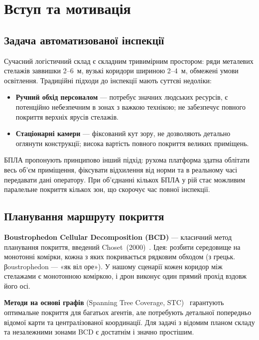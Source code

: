 \section{Вступ та мотивація}

\subsection{Задача автоматизованої інспекції}

Сучасний логістичний склад є складним тривимірним простором: ряди металевих стелажів заввишки 2–6~м, вузькі коридори шириною 2–4~м, обмежені умови освітлення. Традиційні підходи до інспекції мають суттєві недоліки:

\begin{itemize}
  \item \textbf{Ручний обхід персоналом} — потребує значних людських ресурсів, є потенційно небезпечним в зонах з важкою технікою; не забезпечує повного покриття верхніх ярусів стелажів.
  \item \textbf{Стаціонарні камери} — фіксований кут зору, не дозволяють детально оглянути конструкції; висока вартість повного покриття великих приміщень.
\end{itemize}

БПЛА пропонують принципово інший підхід: рухома платформа здатна облітати весь об'єм приміщення, фіксувати відхилення від норми та в реальному часі передавати дані оператору. При об'єднанні кількох БПЛА у рій стає можливим паралельне покриття кількох зон, що скорочує час повної інспекції.

\subsection{Планування маршруту покриття}

\textbf{Boustrophedon Cellular Decomposition (BCD)} — класичний метод планування покриття, введений Choset~(2000)~\cite{Choset2000}. Ідея: розбити середовище на монотонні комірки, кожна з яких покривається рядковим обходом (з грецьк. βoustrophedon — «як віл оре»). У нашому сценарії кожен коридор між стелажами є монотонною коміркою, і дрон виконує один прямий прохід вздовж його осі.

\textbf{Методи на основі графів} (Spanning Tree Coverage, STC)~\cite{Hazon2005} гарантують оптимальне покриття для багатьох агентів, але потребують детальної попередньо відомої карти та централізованої координації. Для задачі з відомим планом складу та незалежними зонами BCD є достатнім і значно простішим.

